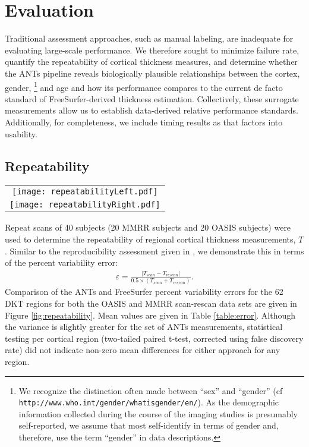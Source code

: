 \section{Evaluation}
Traditional assessment approaches, such as manual
labeling, are inadequate for evaluating large-scale performance.  
We therefore sought to minimize failure rate, quantify the repeatability of cortical
thickness measures, and
determine whether the ANTs pipeline reveals biologically plausible relationships
between the cortex, gender,%
\footnote{
We recognize the distinction often made between ``sex'' and ``gender'' 
(cf {\tt http://www.who.int/gender/whatisgender/en/}).
As the demographic information collected during the course of the imaging studies 
is presumably self-reported, we assume that most self-identify in terms of 
gender and, therefore, use the term ``gender'' in data
descriptions.
}
and age and how its performance compares
to the current de facto standard of FreeSurfer-derived thickness estimation.
Collectively, these surrogate
measurements allow us to establish data-derived relative performance standards.
Additionally, for completeness, we include timing results as that factors into
usability.

\subsection{Repeatability}%

\begin{figure*}[htb]
  \centering
  \begin{tabular}{c}
  \texttt{[image: repeatabilityLeft.pdf]} \\
  \texttt{[image: repeatabilityRight.pdf]}
  \end{tabular}
  \caption{Percent error variability for both ANTs and FreeSurfer pipelines 
           over the left and right hemispheres of both the MMRR and OASIS
           data subsets within the 62 regions defined by the
           Desikan-Killiany-Tourville atlas.  Both methods demonstrate good repeatability
           qualities.
           }
  \label{fig:repeatability}
\end{figure*}

Repeat scans of 40 subjects (20 MMRR subjects and 20 OASIS subjects) were 
used to determine the repeatability of regional cortical thickness 
measurements, $T$.  Similar to the reproducibility 
assessment given in \cite{jovicich2013}, we
demonstrate this in terms of the percent variability error:
\begin{align}
\varepsilon = \frac{|T_{scan} - T_{rescan}|}{0.5 \times (T_{scan} + T_{rescan})}.
\end{align}
Comparison of the ANTs and FreeSurfer percent variability errors for the 62 DKT 
regions for both the OASIS and MMRR scan-rescan data sets
are given in Figure \ref{fig:repeatability}.  Mean values are given in Table \ref{table:error}.
Although the variance is slightly greater 
for the set of ANTs measurements, statistical testing per cortical region 
(two-tailed paired t-test, corrected using false discovery rate) did not indicate 
non-zero mean differences for either approach for any region.


